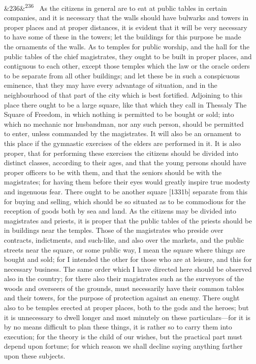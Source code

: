 \documentclass[12pt]{article}
\newcommand{\para}[1][]{\par\noindent\ifx&#1&\else\textsuperscript{\footnotesize #1}~\fi}
\begin{document}
\para[236] As the citizens in general are to eat at public tables in certain companies, and it is necessary that the walls should have bulwarks and towers in proper places and at proper distances, it is evident that it will be very necessary to have some of these in the towers; let the buildings for this purpose be made the ornaments of the walls. As to temples for public worship, and the hall for the public tables of the chief magistrates, they ought to be built in proper places, and contiguous to each other, except those temples which the law or the oracle orders to be separate from all other buildings; and let these be in such a conspicuous eminence, that they may have every advantage of situation, and in the neighbourhood of that part of the city which is best fortified. Adjoining to this place there ought to be a large square, like that which they call in Thessaly The Square of Freedom, in which nothing is permitted to be bought or sold; into which no mechanic nor husbandman, nor any such person, should be permitted to enter, unless commanded by the magistrates. It will also be an ornament to this place if the gymnastic exercises of the elders are performed in it. It is also proper, that for performing these exercises the citizens should be divided into distinct classes, according to their ages, and that the young persons should have proper officers to be with them, and that the seniors should be with the magistrates; for having them before their eyes would greatly inspire true modesty and ingenuous fear. There ought to be another square [1331b] separate from this for buying and selling, which should be so situated as to be commodious for the reception of goods both by sea and land. As the citizens may be divided into magistrates and priests, it is proper that the public tables of the priests should be in buildings near the temples. Those of the magistrates who preside over contracts, indictments, and such-like, and also over the markets, and the public streets near the square, or some public way, I mean the square where things are bought and sold; for I intended the other for those who are at leisure, and this for necessary business. The same order which I have directed here should be observed also in the country; for there also their magistrates such as the surveyors of the woods and overseers of the grounds, must necessarily have their common tables and their towers, for the purpose of protection against an enemy. There ought also to be temples erected at proper places, both to the gods and the heroes; but it is unnecessary to dwell longer and most minutely on these particulars---for it is by no means difficult to plan these things, it is rather so to carry them into execution; for the theory is the child of our wishes, but the practical part must depend upon fortune; for which reason we shall decline saying anything farther upon these subjects.
\end{document}
